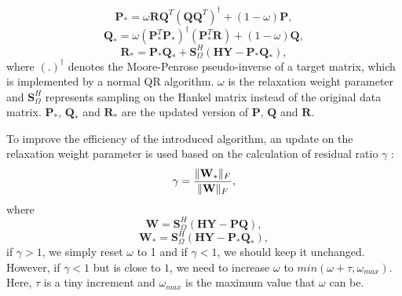 \begin{equation}
\label{eq:lmafit1}
\mathbf{P}_{\ast}=\omega\mathbf{R}\mathbf{Q}^T(\mathbf{Q}\mathbf{Q}^T)^{\dagger} + (1-\omega)\mathbf{P},
\end{equation}
\begin{equation}
\label{eq:lmafit2}
\mathbf{Q}_{\ast}=\omega(\mathbf{P}_{\ast}^T\mathbf{P}_{\ast})^{\dagger}(\mathbf{P}_{\ast}^T\mathbf{R}) + (1-\omega)\mathbf{Q},
\end{equation}
\begin{equation}
\label{eq:lmafit3}
\mathbf{R}_{\ast}=\mathbf{P}_{\ast}\mathbf{Q}_{\ast} + \mathbf{S}_{\Omega}^{H}(\mathbf{H}\mathbf{Y}-\mathbf{P}_{\ast}\mathbf{Q}_{\ast}),
\end{equation}
where $(.)^{\dagger}$ denotes the Moore-Penrose pseudo-inverse of a target matrix, which is implemented by a normal QR algorithm. $\omega$ is the relaxation weight parameter and $\mathbf{S}_{\Omega}^{H}$ represents sampling on the Hankel matrix instead of the original data matrix. $\mathbf{P}_{\ast}$, $\mathbf{Q}_{\ast}$ and $\mathbf{R}_{\ast}$ are the updated version of $\mathbf{P}$, $\mathbf{Q}$ and $\mathbf{R}$.

To improve the efficiency of the introduced algorithm, an update on the relaxation weight parameter is used based on the calculation of residual ratio $\gamma$ :
\begin{equation}
\label{eq:iter_cri1}
\gamma=\dfrac{\Arrowvert \mathbf{W}_{\ast}\Arrowvert_F}{\Arrowvert \mathbf{W}\Arrowvert_F},
\end{equation}
where
\begin{equation}
\label{eq:iter_cri2}
\mathbf{W}=\mathbf{S}_{\Omega}^{H}(\mathbf{H}\mathbf{Y}-\mathbf{P}\mathbf{Q}),
\end{equation}
\begin{equation}
\label{eq:iter_cri3}
\mathbf{W}_{\ast}=\mathbf{S}_{\Omega}^{H}(\mathbf{H}\mathbf{Y}-\mathbf{P}_{\ast}\mathbf{Q}_{\ast}),
\end{equation}
if $\gamma>1$, we simply reset $\omega$ to 1 and if $\gamma<1$, we should keep it unchanged. However, if $\gamma<1$ but is close to $1$, we need to increase $\omega$ to $min(\omega+\tau, \omega_{max})$. Here, $\tau$ is a tiny increment and $\omega_{max}$ is the maximum value that $\omega$ can be.

